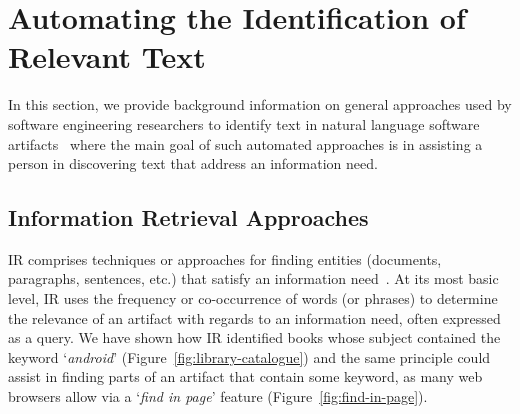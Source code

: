 


\section{Automating the Identification of Relevant Text}
\label{cp2:general-approaches}




In this section, we provide background information on general 
approaches used
by software engineering researchers 
to identify text in natural language software artifacts~\cite{Bavota2016}
where the main goal of such automated approaches is in assisting a person in discovering
text that address an information need.






\subsection{Information Retrieval Approaches}
\label{cp2:information-retrieval}


\acf{IR} comprises techniques
or approaches for finding entities (documents, paragraphs, sentences, etc.)
that satisfy an information need~\cite{manning2010IR}.
At its most basic level, 
\acs{IR}
uses the 
frequency or co-occurrence of words (or phrases) to determine the relevance
of an artifact with regards to an information need, often expressed as a query.
We have shown how \acs{IR} identified
books whose subject contained
the keyword `\textit{android}' (Figure~\ref{fig:library-catalogue})
and the same principle could assist 
in finding parts of an artifact that contain some keyword, 
as many web browsers allow via a `\textit{find in page}' feature (Figure~\ref{fig:find-in-page}).








